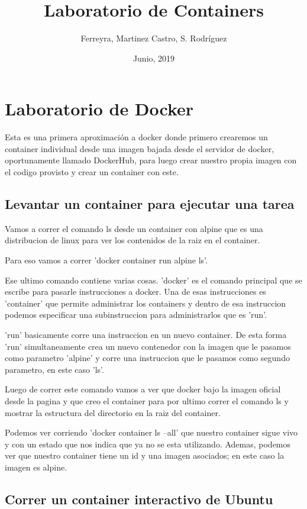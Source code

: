 \documentclass[11pt]{article} %
\title{Laboratorio de Containers}
\author{Ferreyra, Martinez Castro, S. Rodríguez}
\date{Junio, 2019} %
\begin{document}
\maketitle

\section{Laboratorio de Docker}
Esta es una primera aproximación a docker donde primero crearemos un container individual desde una imagen bajada desde el servidor de docker, oportunamente llamado DockerHub, para luego crear nuestro propia imagen con el codigo provisto y crear un container con este.

\subsection{Levantar un container para ejecutar una tarea}

Vamos a correr el comando ls desde un container con alpine que es una distribucion de linux para ver los contenidos de la raiz en el container.

Para eso vamos a correr 'docker container run alpine ls'.

Ese ultimo comando contiene varias cosas. 'docker' es el comando principal que se escribe para pasarle instrucciones a docker. Una de esas instrucciones es 'container' que permite administrar los containers y dentro de esa instruccion podemos especificar una subinstruccion para administrarlos que es 'run'.

'run' basicamente corre una instruccion en un nuevo container. De esta forma 'run' simultaneamente crea un nuevo contenedor con la imagen que le pasamos como parametro 'alpine' y corre una instruccion que le pasamos como segundo parametro, en este caso 'ls'.


Luego de correr este comando vamos a ver que docker bajo la imagen oficial desde la pagina y que creo el container para por ultimo correr el comando ls y mostrar la estructura del directorio en la raiz del container.

Podemos ver corriendo 'docker container ls --all' que nuestro container sigue vivo y con un estado que nos indica que ya no se esta utilizando. Ademas, podemos ver que nuestro  container tiene un id y una imagen asociados; en este caso la imagen es alpine.

\subsection{Correr un container interactivo de Ubuntu}
\end{document}
